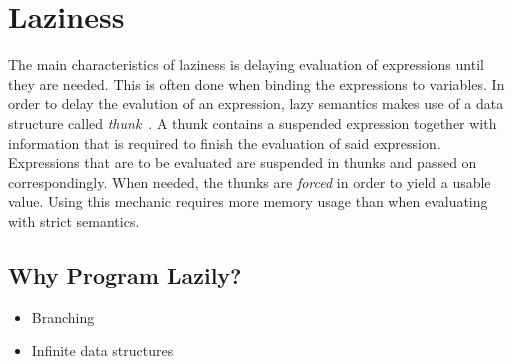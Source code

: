 \section{Laziness}
The main characteristics of laziness is delaying evaluation of expressions
until they are needed. This is often done when binding the expressions to
variables. In order to delay the evalution of an expression, lazy semantics
makes use of a data structure called
\textit{thunk}~\cite{Ennals:2003:OEA:944746.944731}. A thunk contains a
suspended expression together with information that is required to finish the
evaluation of said expression. Expressions that are to be
evaluated are suspended in thunks and passed on correspondingly. When needed,
the thunks are \textit{forced} in order to yield a usable value. Using this
mechanic requires more memory usage than when evaluating with strict semantics.

\subsection{Why Program Lazily?}
\begin{itemize}
  \item Branching
  \item Infinite data structures
\end{itemize}





